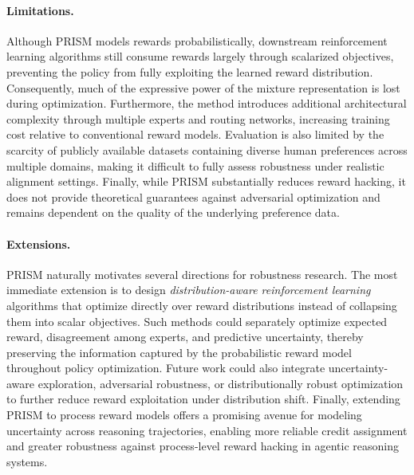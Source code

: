 \documentclass[11pt]{article}
\begin{document}
\paragraph{Limitations.}
Although PRISM models rewards probabilistically, downstream reinforcement learning algorithms still consume rewards largely through scalarized objectives, preventing the policy from fully exploiting the learned reward distribution. Consequently, much of the expressive power of the mixture representation is lost during optimization. Furthermore, the method introduces additional architectural complexity through multiple experts and routing networks, increasing training cost relative to conventional reward models. Evaluation is also limited by the scarcity of publicly available datasets containing diverse human preferences across multiple domains, making it difficult to fully assess robustness under realistic alignment settings. Finally, while PRISM substantially reduces reward hacking, it does not provide theoretical guarantees against adversarial optimization and remains dependent on the quality of the underlying preference data.  

\paragraph{Extensions.}
PRISM naturally motivates several directions for robustness research. The most immediate extension is to design \emph{distribution-aware reinforcement learning} algorithms that optimize directly over reward distributions instead of collapsing them into scalar objectives. Such methods could separately optimize expected reward, disagreement among experts, and predictive uncertainty, thereby preserving the information captured by the probabilistic reward model throughout policy optimization. Future work could also integrate uncertainty-aware exploration, adversarial robustness, or distributionally robust optimization to further reduce reward exploitation under distribution shift. Finally, extending PRISM to process reward models offers a promising avenue for modeling uncertainty across reasoning trajectories, enabling more reliable credit assignment and greater robustness against process-level reward hacking in agentic reasoning systems.  
\end{document}
